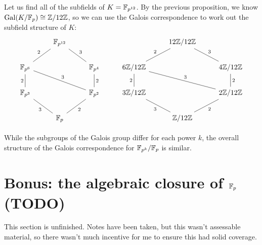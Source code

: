 \begin{example}
    Let us find all of the subfields of $K = \mathbb{{F}}_{p^{12}}$. By the previous proposition, we know $\operatorname{Gal}(K/\mathbb{{F}}_p) \cong \mathbb{{Z}}/{{12}}\mathbb{{Z}}$, so we can use the Galois correspondence to work out the subfield structure of $K$:
    \[
        \begin{tikzcd}
        	& {\mathbb{F}_{p^{12}}} &&& {12\mathbb{Z}/12\mathbb{Z}} \\
        	{\mathbb{F}_{p^6}} && {\mathbb{F}_{p^4}} & {6\mathbb{Z}/12\mathbb{Z}} && {4\mathbb{Z}/12\mathbb{Z}} \\
        	{\mathbb{F}_{p^3}} && {\mathbb{F}_{p^2}} & {3\mathbb{Z}/12\mathbb{Z}} && {2\mathbb{Z}/12\mathbb{Z}} \\
        	& {\mathbb{F}_p} &&& {\mathbb{Z}/12\mathbb{Z}}
        	\arrow["3", no head, from=4-2, to=3-1]
        	\arrow["2"', no head, from=4-2, to=3-3]
        	\arrow["2"', no head, from=3-3, to=2-3]
        	\arrow["2", no head, from=3-1, to=2-1]
        	\arrow["2", no head, from=2-1, to=1-2]
        	\arrow["3"', no head, from=2-3, to=1-2]
        	\arrow["3"', no head, from=3-3, to=2-1]
        	\arrow["2"', no head, from=4-5, to=3-6]
        	\arrow["2"', no head, from=3-6, to=2-6]
        	\arrow["3"', no head, from=2-6, to=1-5]
        	\arrow["2", no head, from=2-4, to=1-5]
        	\arrow["2", no head, from=3-4, to=2-4]
        	\arrow["3", no head, from=4-5, to=3-4]
        	\arrow["3"', no head, from=3-6, to=2-4]
        \end{tikzcd}
    \]
\end{example}

\begin{remark}
    While the subgroups of the Galois group differ for each power $k$, the overall structure of the Galois correspondence for $\mathbb{{F}}_{p^k}/\mathbb{{F}}_p$ is similar.
\end{remark}

\section{Bonus: the algebraic closure of $\mathbb{{F}}_p$ (TODO)}

\begin{block}
    This section is unfinished. Notes have been taken, but this wasn't assessable material, so there wasn't much incentive for me to ensure this had solid coverage.
\end{block}

